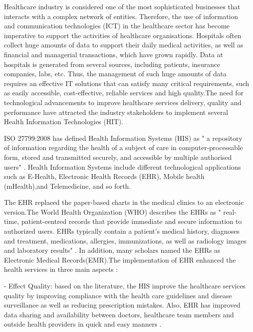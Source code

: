 
Healthcare industry is considered one of the most sophisticated businesses that interacts with a complex network of entities. Therefore, the use of information and communication technologies (ICT) in the healthcare sector has become imperative to support the activities of healthcare organisations. Hospitals often collect huge amounts of data to support their daily medical activities, as well as financial and managerial transactions, which have grown rapidly. Data at hospitals is generated from several sources, including patients, insurance companies, labs, etc. Thus, the management of such huge amounts of data requires an effective IT solutions that can satisfy many critical requirements, such as easily accessible, cost-effective, reliable services and high quality.The need for technological advancements to improve healthcare services delivery, quality and performance have attracted the industry stakeholders to implement  several Health Information Technologies (HIT).

ISO 27799:2008 has defined Health Information Systems (HIS) as " a repository of information regarding the health of a subject of care in computer-processable form, stored and transmitted securely, and accessible by multiple authorised users" \cite{ISO2008}. Health Information Systems include different technological applications such as E-Health, Electronic Health Records (EHR), Mobile health (mHealth),and Telemedicine, and so forth.


The EHR replaced the paper-based charts in the medical clinics to an electronic version.The World Health Organization (WHO) \cite{WorldHealthOrganization2016}  describes the EHRs as  " real-time, patient-centred records that provide immediate and secure information to authorized users. EHRs typically contain a patient’s medical history, diagnoses and treatment, medications, allergies, immunizations, as well as radiology images and laboratory results" 
 \cite{OfHealth}. In addition, many scholars named the EHRs as Electronic Medical Records(EMR).The implementation of EHR enhanced the health services in three main aspects \cite{chaudhry2006systematic,OfHealth}:


- Effect Quality: based on the literature, the HIS improve the healthcare services quality by improving compliance with the health care guidelines and disease surveillance as well as reducing prescription mistakes\cite{chaudhry2006systematic}. Also, EHR has improved data sharing and availability between doctors, healthcare team members and outside health providers in quick and easy manners \cite{OfHealth}.



